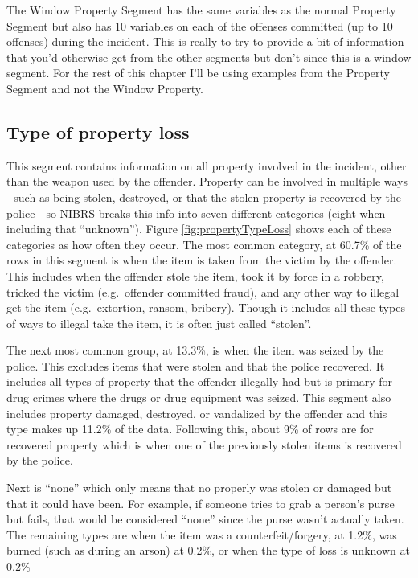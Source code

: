 \documentclass[
  12pt,
  openany]{book}
\begin{document}
The Window Property Segment has the same variables as the normal Property Segment but also has 10 variables on each of the offenses committed (up to 10 offenses) during the incident. This is really to try to provide a bit of information that you'd otherwise get from the other segments but don't since this is a window segment. For the rest of this chapter I'll be using examples from the Property Segment and not the Window Property.

\hypertarget{propertyLoss}{%
\subsection{Type of property loss}\label{propertyLoss}}

This segment contains information on all property involved in the incident, other than the weapon used by the offender. Property can be involved in multiple ways - such as being stolen, destroyed, or that the stolen property is recovered by the police - so NIBRS breaks this info into seven different categories (eight when including that ``unknown''). Figure \ref{fig:propertyTypeLoss} shows each of these categories as how often they occur. The most common category, at 60.7\% of the rows in this segment is when the item is taken from the victim by the offender. This includes when the offender stole the item, took it by force in a robbery, tricked the victim (e.g.~offender committed fraud), and any other way to illegal get the item (e.g.~extortion, ransom, bribery). Though it includes all these types of ways to illegal take the item, it is often just called ``stolen''.

The next most common group, at 13.3\%, is when the item was seized by the police. This excludes items that were stolen and that the police recovered. It includes all types of property that the offender illegally had but is primary for drug crimes where the drugs or drug equipment was seized. This segment also includes property damaged, destroyed, or vandalized by the offender and this type makes up 11.2\% of the data. Following this, about 9\% of rows are for recovered property which is when one of the previously stolen items is recovered by the police.

Next is ``none'' which only means that no properly was stolen or damaged but that it could have been. For example, if someone tries to grab a person's purse but fails, that would be considered ``none'' since the purse wasn't actually taken. The remaining types are when the item was a counterfeit/forgery, at 1.2\%, was burned (such as during an arson) at 0.2\%, or when the type of loss is unknown at 0.2\%
\end{document}
